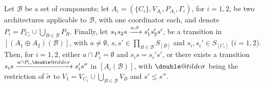 \documentclass{llncs}
\makeatletter
\newcommand{\cB}{\ensuremath{\mathcal{B}}}
\newcommand{\goesto}[2][]{\ensuremath{\xrightarrow[#1]{#2}}}
\newcommand{\val}[3][]{%
  \ensuremath{#1{\sigma}^{#2}_{#3}}%
}
\newcommand{\semopen}[1]{\ensuremath{[{#1}]}}
\newcommand{\arcomp}{\oplus}
\newcommand{\order}{\leqslant}
\newcommand{\doubletilde}[1]{{%
  \mathpalette\double@tilde{#1}%
}}
\newcommand{\double@tilde}[2]{%
  \sbox\z@{$\m@th#1\tilde{#2}$}%
  \ht\z@=.9\ht\z@
  \tilde{\box\z@}%
}
\makeatother
\begin{document}
\begin{lemma}
  \label{lem:onestep}
  Let $\cB$ be a set of components; let $A_i = (\{C_i\}, V_{A_i},
  P_{A_i}, \Gamma_i)$, for $i = 1,2$, be two architectures
  applicable to $\cB$, with one coordinator each, and denote
  $P_i = P_{C_i} \cup \bigcup_{B \in \cB} P_B$.
  Finally, let
%
  $
  s_1 s_2 s
%
  \goesto{a, \tilde{\val{}{}}}
%
  s_1' s_2' s'
  $,
%
  be a transition in $\semopen{(A_1 \arcomp A_2)(\cB)}$, with
  $a \neq \emptyset$, 
  $s, s' \in \prod_{B \in \cB} S_{\semopen{B}}$
  and
  $s_i, s_i' \in S_{\semopen{C_i}}$ ($i=1,2$).
%
  Then, for $i=1,2$, either $a \cap P_i = \emptyset$ and $s_i s=
  s_i' s'$, or there exists a transition
%
  $
  s_i s
%
  \goesto{a \cap P_i, \val[\doubletilde]{}{}}
%
  s_i' s''
  $ 
%
  in $\semopen{A_i(\cB)}$, with
  $\val[\doubletilde]{}{}$ being the restriction of
  $\val[\tilde]{}{}$ to
  $V_1 = V_{C_1} \cup \bigcup_{B \in \cB} V_B$ and
  $s' \order s''$.
\end{lemma}
%
\end{document}
